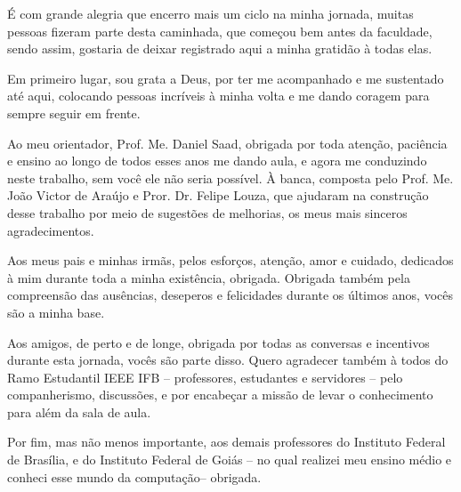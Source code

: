 É com grande alegria que encerro mais um ciclo na minha jornada, muitas pessoas fizeram parte desta caminhada, que começou bem antes da faculdade, sendo assim, gostaria de deixar registrado aqui a minha gratidão à todas elas. 

Em primeiro lugar, sou grata a Deus, por ter me acompanhado e me sustentado até aqui, colocando pessoas incríveis à minha volta e me dando coragem para sempre seguir em frente.

Ao meu  orientador, Prof. Me. Daniel Saad, obrigada por toda atenção, paciência e ensino ao longo de todos esses anos me dando aula, e agora me conduzindo neste trabalho, sem você ele não seria possível. À banca, composta pelo Prof. Me. João Victor de Araújo e Pror. Dr. Felipe Louza, que ajudaram na construção desse trabalho por meio de sugestões de melhorias, os meus mais sinceros agradecimentos.

Aos meus pais e minhas irmãs, pelos esforços, atenção, amor e cuidado, dedicados à mim durante toda a minha existência, obrigada. Obrigada também pela compreensão das ausências, deseperos e felicidades durante os últimos anos, vocês são a minha base. 

Aos amigos, de perto e de longe, obrigada por todas as conversas e incentivos durante esta jornada, vocês são parte disso. Quero agradecer também à todos do Ramo Estudantil IEEE IFB -- professores, estudantes e servidores -- pelo companherismo, discussões, e por encabeçar a missão de levar o conhecimento para além da sala de aula.

Por fim, mas não menos importante, aos demais professores do Instituto Federal de Brasília, e do Instituto Federal de Goiás -- no qual realizei meu ensino médio e conheci esse mundo da computação-- obrigada.